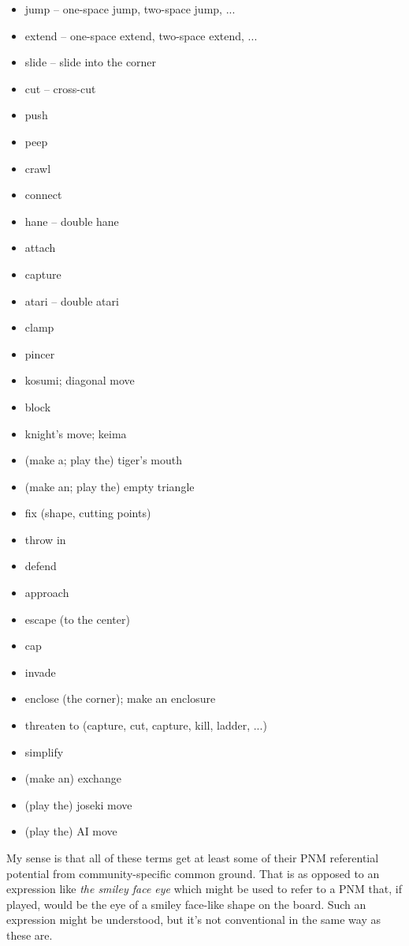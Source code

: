 \documentclass{scrartcl}
\begin{document}
\begin{multicols}{2}
\begin{itemize} 
  \item jump -- one-space jump, two-space jump, ...
  \item extend -- one-space extend, two-space extend, ...
  \item slide -- slide into the corner
  \item cut -- cross-cut
  \item push
  \item peep
  \item crawl
  \item connect
  \item hane -- double hane
  \item attach
  \item capture
  \item atari -- double atari
  \item clamp
  \item pincer
  \item kosumi; diagonal move
  \item block
  \item knight's move; keima
  \item (make a; play the) tiger's mouth
  \item (make an; play the) empty triangle
  \item fix (shape, cutting points)
  \item throw in
  \item defend
  \item approach
  \item escape (to the center)
  \item cap
  \item invade 
  \item enclose (the corner); make an enclosure
  \item threaten to (capture, cut, capture, kill, ladder, ...)
  \item simplify
  \item (make an) exchange
  \item (play the) joseki move
  \item (play the) AI move
\end{itemize}
\end{multicols}

\noindent My sense is that all of these terms get at least some of
their PNM referential potential from community-specific common ground.
That is as opposed to an expression like \emph{the smiley face eye}
which might be used to refer to a PNM that, if played, would be the eye
of a smiley face-like shape on the board.
Such an expression might be understood, but it's not conventional in 
the same way as these are.
\end{document}
